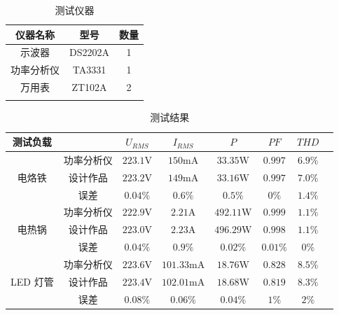 \documentclass[a4paper,12pt,UTF8]{article}
\begin{document}
\begin{table}[H]
    \centering
    \caption{测试仪器}
    \begin{tabular}{ccc}
        \toprule
        仪器名称 & 型号 & 数量  \\ \midrule
        示波器 & DS2202A & 1\\
        功率分析仪 & TA3331 & 1 \\
        万用表 &  ZT102A & 2
        \\ \bottomrule
        \label{tab1}
    \end{tabular}
\end{table}  
\begin{table}[H]
    \centering
    \caption{测试结果}
    \begin{tabular}{@{}cccccccc}
        \toprule
        测试负载 &   & $U_{RMS}$ & $I_{RMS}$ & $P$ & $PF$ & $THD$ \\ \midrule
        \multirow{3}{*}{电烙铁} &  功率分析仪  & $223.1\mathrm{V}$ & $150\mathrm{mA}$ & $33.35\mathrm{W}$ & $0.997$  & $6.9\%$ \\
         & 设计作品 & $223.2\mathrm{V}$ & $149\mathrm{mA}$ & $33.16\mathrm{W}$ & $0.997$  & $7.0\%$ \\
         & 误差 & $0.04\%$ & $0.6\%$ & $0.5\%$ & $0\%$ & $1.4\%$ \\ \midrule
         \multirow{3}{*}{电热锅} &  功率分析仪  & $222.9\mathrm{V}$ & $2.21\mathrm{A}$ &  $492.11\mathrm{W}$  & $0.999$ &  $1.1\%$ \\
         & 设计作品 & $223.0\mathrm{V}$ & $2.23\mathrm{A}$ & $496.29\mathrm{W}$  & $0.998$  & $1.1\%$ \\
         & 误差 & $0.04\%$ & $0.9\%$ & $0.02\%$  & $0.01\%$  & $0\%$ \\ \midrule
         \multirow{3}{*}{LED 灯管} &  功率分析仪  & $223.6\mathrm{V}$ & $101.33\mathrm{mA}$ &  $18.76\mathrm{W}$  & $0.828$ &  $8.5\%$ \\
         & 设计作品 & $223.4\mathrm{V}$ & $102.01\mathrm{mA}$ & $18.68\mathrm{W}$  & $0.819$  & $8.3\%$ \\
         & 误差 & $0.08\%$ & $0.06\%$ & $0.04\%$  & $1\%$  & $2\%$ \\ \bottomrule
        \end{tabular}
    \label{tab2}
\end{table}
\end{document}
